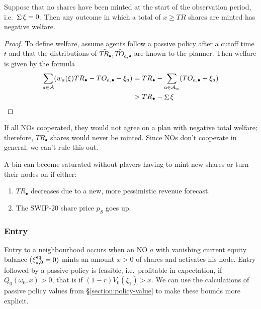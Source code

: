 \begin{proposition}

  Suppose that no shares have been minted at the start of the observation period, i.e.~$\mathop{\Sigma}\xi=0$.
  Then any outcome in which a total of $x\geq TR$ shares are minted has negative welfare.

\end{proposition}
%
\begin{proof}

  To define welfare, assume agents follow a passive policy after a cutoff time $t$ and that the distributions of $T\tilde{R}_\bullet,T\tilde{O}_{a,\bullet}$ are known to the planner.
  Then welfare is given by the formula
  \begin{align*}
    \sum_{a\in\mathcal{A}}(w_a(\xi)TR_\bullet-TO_{a,\bullet} - \xi_a) &= TR_\bullet - \sum_{a\in\mathcal{A}_{\mathtt{on}}}(TO_{a,\bullet} + \xi_a) \\
    &> TR_\bullet - \mathop{\Sigma} \xi \qedhere
  \end{align*}

\end{proof}

If all NOs cooperated, they would not agree on a plan with negative total welfare; therefore, $TR_\bullet$ shares would never be minted.
%
Since NOs don't cooperate in general, we can't rule this out.

A bin can become saturated without players having to mint new shares or turn their nodes on if either:
\begin{enumerate}
  \item $TR_\bullet$ decreases due to a new, more pessimistic revenue forecast.
  \item The SWIP-20 share price $p_S$ goes up.
\end{enumerate}



\subsubsection{Entry}
\label{section:entry}
%
Entry to a neighbourhood occurs when an NO $a$ with vanishing current equity balance ($\xi^{\mathtt{eq}}_{a,0}=0)$ mints an amount $x>0$ of shares and activates his node.
%
Entry followed by a passive policy is feasible, i.e.~profitable in expectation, if $Q_0(\omega_0,x)>0$, that is if $(1-r)V_0(\xi_1) > x$.
%
We can use the calculations of passive policy values from \S\ref{section:policy-value} to make these bounds more explicit.

